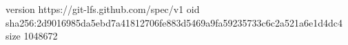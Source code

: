 version https://git-lfs.github.com/spec/v1
oid sha256:2d9016985da5ebd7a41812706fe883d5469a9fa59235733c6c2a521a6e1d4dc4
size 1048672
